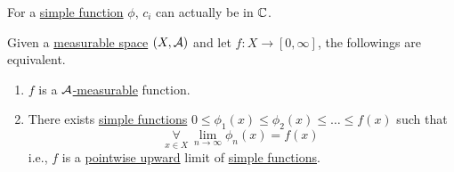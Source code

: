 \begin{prev}
	For a \hyperref[def:simple-function]{simple function} \(\phi\), \(c_{i}\) can actually be in \(\mathbb{\MakeUppercase{c}} \).
\end{prev}

\begin{theorem}
	Given a \hyperref[def:measurable-space]{measurable space} \((X, \mathcal{\MakeUppercase{a}} )\) and let \(f\colon X\to [0, \infty ]\), the followings are equivalent.
	\begin{enumerate}
		\item \(f\) is a \hyperref[def:A-measurable-function]{\(\mathcal{\MakeUppercase{a}} \)-measurable} function.
		\item There exists \hyperref[def:simple-function]{simple functions} \(0\leq \phi_1(x)\leq \phi_2(x)\leq \ldots \leq f(x) \) such that
		      \[
			      \underset{x\in X}{\forall }\ \lim\limits_{n \to \infty} \phi _{n}(x) = f(x)
		      \]
		      i.e., \(f\) is a \underline{\hyperref[def:pointwise-convergence]{pointwise} upward} limit of \hyperref[def:simple-function]{simple functions}.
	\end{enumerate}
\end{theorem}
